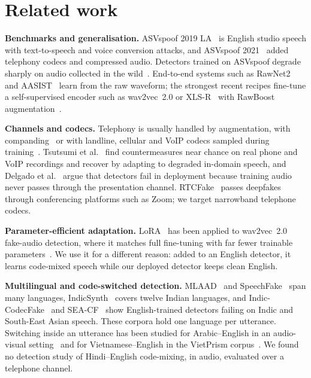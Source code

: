 \documentclass[conference]{IEEEtran}
\begin{document}
\section{Related work}

\textbf{Benchmarks and generalisation.} ASVspoof 2019 LA~\cite{todisco2019asvspoof} is
English studio speech with text-to-speech and voice conversion attacks, and ASVspoof
2021~\cite{liu2023asvspoof2021} added telephony codecs and compressed audio. Detectors
trained on ASVspoof degrade sharply on audio collected in the
wild~\cite{muller2022generalize}. End-to-end systems such as RawNet2~\cite{tak2021rawnet2}
and AASIST~\cite{jung2022aasist} learn from the raw waveform; the strongest recent recipes
fine-tune a self-supervised encoder such as wav2vec~2.0 or
XLS-R~\cite{baevski2020wav2vec,babu2022xlsr} with RawBoost
augmentation~\cite{tak2022rawboost,tak2022wav2vec}.

\textbf{Channels and codecs.} Telephony is usually handled by augmentation, with
companding~\cite{das2021companding} or with landline, cellular and VoIP codecs sampled
during training~\cite{chen2021channel}. Tsutsumi et al.~\cite{tsutsumi2026channel} find
countermeasures near chance on real phone and VoIP recordings and recover by adapting to
degraded in-domain speech, and Delgado et al.~\cite{delgado2026presentation} argue that
detectors fail in deployment because training audio never passes through the presentation
channel. RTCFake~\cite{xue2026rtcfake} passes deepfakes through conferencing platforms such
as Zoom; we target narrowband telephone codecs.

\textbf{Parameter-efficient adaptation.} LoRA~\cite{hu2022lora} has been applied to
wav2vec~2.0 fake-audio detection, where it matches full fine-tuning with far fewer
trainable parameters~\cite{wang2023lora}. We use it for a different reason: added to an
English detector, it learns code-mixed speech while our deployed detector keeps clean
English.

\textbf{Multilingual and code-switched detection.} MLAAD~\cite{muller2024mlaad} and
SpeechFake~\cite{huang2025speechfake} span many languages,
IndicSynth~\cite{sharma2025indicsynth} covers twelve Indian languages, and
Indic-CodecFake~\cite{girish2026indiccodecfake} and SEA-CF~\cite{phukan2026seacf} show
English-trained detectors failing on Indic and South-East Asian speech. These corpora hold
one language per utterance. Switching inside an utterance has been studied for
Arabic--English in an audio-visual setting~\cite{kuckreja2026habibi} and for
Vietnamese--English in the VietPrism corpus~\cite{hoang2026vietprism}. We found no
detection study of Hindi--English code-mixing, in audio, evaluated over a telephone
channel.
\end{document}
